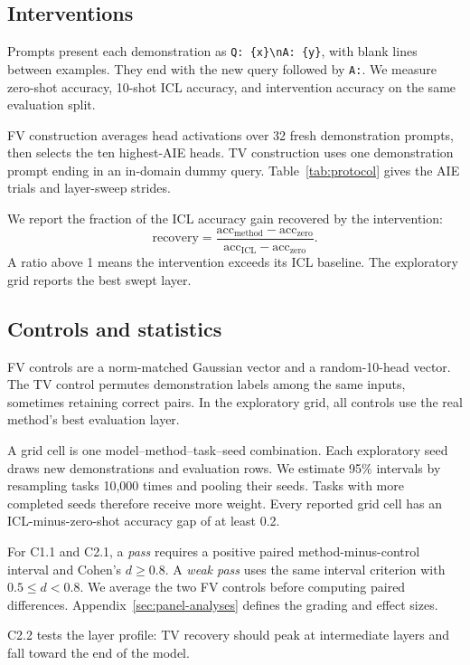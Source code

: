 \documentclass[11pt]{article}
\begin{document}
\subsection{Interventions}

Prompts present each demonstration as \texttt{Q: \{x\}\textbackslash nA: \{y\}}, with blank lines between examples. They end with the new query followed by \texttt{A:}. We measure zero-shot accuracy, 10-shot ICL accuracy, and intervention accuracy on the same evaluation split.

FV construction averages head activations over 32 fresh demonstration prompts, then selects the ten highest-AIE heads. TV construction uses one demonstration prompt ending in an in-domain dummy query. Table~\ref{tab:protocol} gives the AIE trials and layer-sweep strides.

We report the fraction of the ICL accuracy gain recovered by the intervention:
\[
  \text{recovery} = \frac{\text{acc}_{\text{method}}-\text{acc}_{\text{zero}}}
                            {\text{acc}_{\text{ICL}}-\text{acc}_{\text{zero}}}.
\]
A ratio above 1 means the intervention exceeds its ICL baseline. The exploratory grid reports the best swept layer.

\subsection{Controls and statistics}

FV controls are a norm-matched Gaussian vector and a random-10-head vector. The TV control permutes demonstration labels among the same inputs, sometimes retaining correct pairs. In the exploratory grid, all controls use the real method's best evaluation layer.

A grid cell is one model--method--task--seed combination. Each exploratory seed draws new demonstrations and evaluation rows. We estimate 95\% intervals by resampling tasks 10,000 times and pooling their seeds. Tasks with more completed seeds therefore receive more weight. Every reported grid cell has an ICL-minus-zero-shot accuracy gap of at least 0.2.

For C1.1 and C2.1, a \emph{pass} requires a positive paired method-minus-control interval and Cohen's $d\geq0.8$. A \emph{weak pass} uses the same interval criterion with $0.5\leq d<0.8$. We average the two FV controls before computing paired differences. Appendix~\ref{sec:panel-analyses} defines the grading and effect sizes.

C2.2 tests the layer profile: TV recovery should peak at intermediate layers and fall toward the end of the model.
\end{document}
